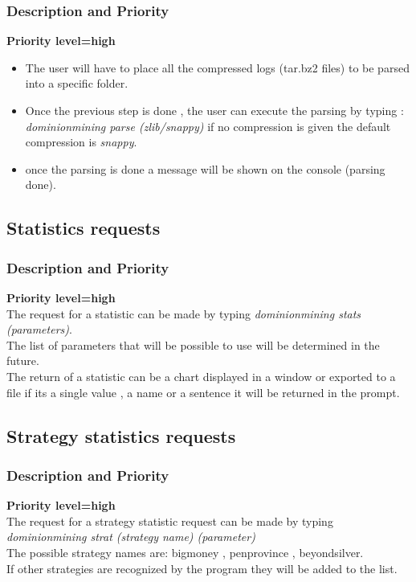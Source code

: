 \documentclass{scrreprt}
\begin{document}
\subsubsection{Description and Priority}
\textbf{Priority level=high}\\
\begin{itemize}
  \item The user will have to place all the  compressed logs (tar.bz2 files) to be parsed into a
    specific folder.
  \item Once the previous step is done , the user can execute the parsing by
      typing : \textit{dominionmining parse (zlib/snappy)} if no compression is
      given the default compression is \textit{snappy}.
      \item once the parsing is done a message will be shown on the
        console (parsing done).
\end{itemize}

\subsection{Statistics requests}
\subsubsection{Description and Priority}
\textbf{Priority level=high}\\
The request for a statistic can be made by typing \textit{dominionmining stats (parameters)}.  \\
The list of parameters that will be possible to use will be determined in the
future.\\

The return of a statistic can be a chart displayed in a window or exported to a
file if its a single value , a name or a sentence it will be returned in the prompt.

\subsection{Strategy statistics requests}
\subsubsection{Description and Priority}
\textbf{Priority level=high}\\
The request for a strategy statistic request can be made by typing \textit{dominionmining strat (strategy name) (parameter)}\\
The possible strategy names are:
bigmoney , penprovince , beyondsilver.\\
If other strategies are recognized by the program they will be added to the list.
\end{document}

